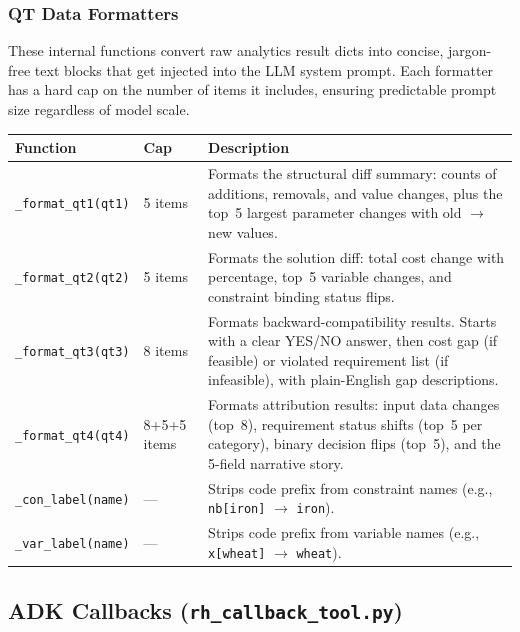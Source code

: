 \documentclass[11pt, a4paper]{article}
\begin{document}
\subsubsection{QT Data Formatters}

These internal functions convert raw analytics result dicts into concise,
jargon-free text blocks that get injected into the LLM system prompt.
Each formatter has a hard cap on the number of items it includes,
ensuring predictable prompt size regardless of model scale.

\begin{longtable}{p{4.5cm} p{2cm} p{7.5cm}}
\toprule
\textbf{Function} & \textbf{Cap} & \textbf{Description} \\
\midrule
\texttt{\_format\_qt1(qt1)} & 5 items &
    Formats the structural diff summary: counts of additions, removals,
    and value changes, plus the top~5 largest parameter changes with
    old $\to$ new values. \\
\midrule
\texttt{\_format\_qt2(qt2)} & 5 items &
    Formats the solution diff: total cost change with percentage,
    top~5 variable changes, and constraint binding status flips. \\
\midrule
\texttt{\_format\_qt3(qt3)} & 8 items &
    Formats backward-compatibility results.  Starts with a clear
    YES/NO answer, then cost gap (if feasible) or violated requirement
    list (if infeasible), with plain-English gap descriptions. \\
\midrule
\texttt{\_format\_qt4(qt4)} & 8+5+5 items &
    Formats attribution results: input data changes (top~8),
    requirement status shifts (top~5 per category), binary decision
    flips (top~5), and the 5-field narrative story. \\
\midrule
\texttt{\_con\_label(name)} & --- &
    Strips code prefix from constraint names
    (e.g., \texttt{nb[iron]} $\to$ \texttt{iron}). \\
\midrule
\texttt{\_var\_label(name)} & --- &
    Strips code prefix from variable names
    (e.g., \texttt{x[wheat]} $\to$ \texttt{wheat}). \\
\bottomrule
\end{longtable}


\subsection{ADK Callbacks (\texttt{rh\_callback\_tool.py})}
\end{document}
